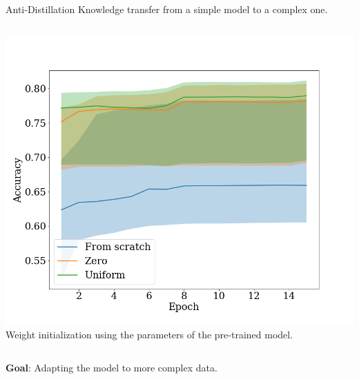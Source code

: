 \documentclass{beamer}
\begin{document}
\begin{frame}{Anti-Distillation}
Knowledge transfer from a simple model to a complex one.

\begin{columns}[c]
\includegraphics[width=\textwidth]{accuracy.png}
Weight initialization using the parameters of the pre-trained model.
\end{columns}
\textbf{Goal}: Adapting the model to more complex data.

\end{frame}
\end{document}
